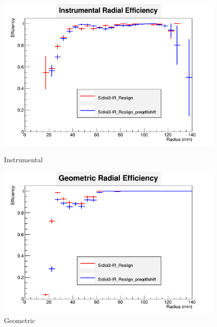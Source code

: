 \documentclass{report}
\begin{document}
                \begin{figure}[H]
                    \centering
                    \begin{minipage}{0.4\textwidth}
                        \includegraphics[width=\textwidth]{RadialEfficiencyFP_instrumental}
                        \caption{Instrumental}
                        \label{lstar_beamcal_inst}
                    \end{minipage}
                    \begin{minipage}{0.4\textwidth}
                        \includegraphics[width=\textwidth]{RadialEfficiencyFP_geometric}
                        \caption{Geometric}
                        \label{lstar_beamcal_geom}
                    \end{minipage}
                \end{figure}
\end{document}
